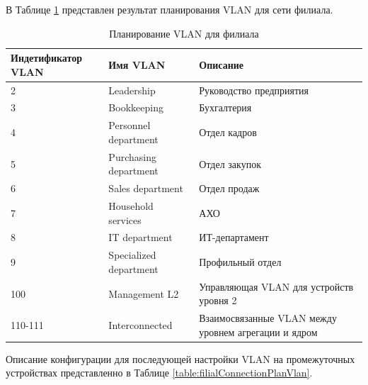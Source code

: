 \documentclass[14pt, a4paper]{extarticle}
\numberwithin{equation}{section}
\begin{document}
В Таблице \ref{table:filialVlan} представлен результат планирования VLAN для сети филиала.
\begin{table}[H]
\centering
\small
\caption{Планирование VLAN для филиала}
\label{table:filialVlan}
\begin{tabular}{|l|l|m{6cm}|}
\hline
\textbf{Индетификатор VLAN} & \textbf{Имя VLAN} & \textbf{Описание} \\
\hline
2 & Leadership & Руководство предприятия \\
\hline
3 & Bookkeeping & Бухгалтерия \\
\hline
4 & Personnel department & Отдел кадров \\
\hline 
5 & Purchasing department & Отдел закупок \\
\hline 
6 & Sales department & Отдел продаж \\
\hline 
7 & Household services & АХО \\
\hline 
8 & IT department & ИТ-департамент \\
\hline
9 & Specialized department & Профильный отдел \\
\hline
100 & Management L2 & Управляющая VLAN для устройств уровня 2 \\
\hline
110-111 & Interconnected & Взаимосвязанные VLAN между уровнем агрегации и ядром \\
\hline
\end{tabular}
\end{table}


Описание конфигурации для последующей настройки VLAN на промежуточных устройствах
представленно в Таблице \ref{table:filialConnectionPlanVlan}.
\end{document}
